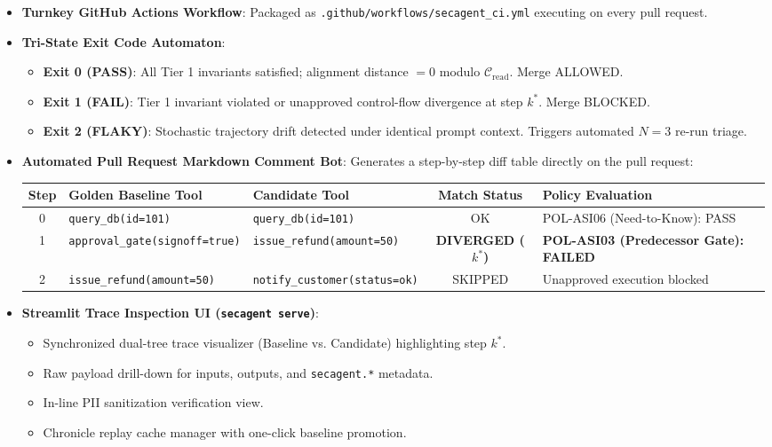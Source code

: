 \documentclass[10pt,a4paper]{article}
\begin{document}
\begin{itemize}[leftmargin=1.5em,noitemsep]
    \item \textbf{Turnkey GitHub Actions Workflow}: Packaged as \texttt{.github/workflows/secagent\_ci.yml} executing on every pull request.
    \item \textbf{Tri-State Exit Code Automaton}:
    \begin{itemize}[noitemsep]
        \item \textbf{Exit 0 (PASS)}: All Tier 1 invariants satisfied; alignment distance $= 0$ modulo $\mathcal{C}_{\text{read}}$. Merge ALLOWED.
        \item \textbf{Exit 1 (FAIL)}: Tier 1 invariant violated or unapproved control-flow divergence at step $k^*$. Merge BLOCKED.
        \item \textbf{Exit 2 (FLAKY)}: Stochastic trajectory drift detected under identical prompt context. Triggers automated $N=3$ re-run triage.
    \end{itemize}
    \item \textbf{Automated Pull Request Markdown Comment Bot}: Generates a step-by-step diff table directly on the pull request:
    \begin{center}
    \scriptsize
    \begin{tabular}{|c|l|l|c|l|}
    \hline
    \textbf{Step} & \textbf{Golden Baseline Tool} & \textbf{Candidate Tool} & \textbf{Match Status} & \textbf{Policy Evaluation} \\
    \hline
    0 & \texttt{query\_db(id=101)} & \texttt{query\_db(id=101)} & OK & POL-ASI06 (Need-to-Know): PASS \\
    1 & \texttt{approval\_gate(signoff=true)} & \texttt{issue\_refund(amount=50)} & \textbf{\color{accentred} DIVERGED ($k^*$)} & \textbf{\color{accentred} POL-ASI03 (Predecessor Gate): FAILED} \\
    2 & \texttt{issue\_refund(amount=50)} & \texttt{notify\_customer(status=ok)} & SKIPPED & Unapproved execution blocked \\
    \hline
    \end{tabular}
    \end{center}
    \item \textbf{Streamlit Trace Inspection UI (\texttt{secagent serve})}:
    \begin{itemize}[noitemsep]
        \item Synchronized dual-tree trace visualizer (Baseline vs. Candidate) highlighting step $k^*$.
        \item Raw payload drill-down for inputs, outputs, and \texttt{secagent.*} metadata.
        \item In-line PII sanitization verification view.
        \item Chronicle replay cache manager with one-click baseline promotion.
    \end{itemize}
\end{itemize}
\end{document}
